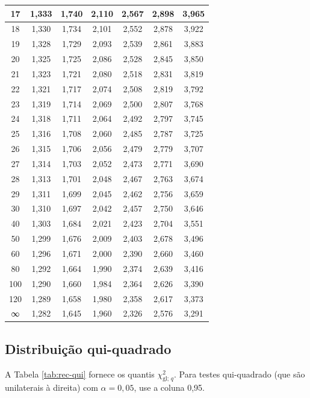 \documentclass[
]{book}
\begin{document}
\begin{table}
\begin{tabular}[t]{c|c|c|c|c|c|c}
\hline
17 & 1,333 & 1,740 & 2,110 & 2,567 & 2,898 & 3,965\\
\hline
18 & 1,330 & 1,734 & 2,101 & 2,552 & 2,878 & 3,922\\
\hline
19 & 1,328 & 1,729 & 2,093 & 2,539 & 2,861 & 3,883\\
\hline
20 & 1,325 & 1,725 & 2,086 & 2,528 & 2,845 & 3,850\\
\hline
21 & 1,323 & 1,721 & 2,080 & 2,518 & 2,831 & 3,819\\
\hline
22 & 1,321 & 1,717 & 2,074 & 2,508 & 2,819 & 3,792\\
\hline
23 & 1,319 & 1,714 & 2,069 & 2,500 & 2,807 & 3,768\\
\hline
24 & 1,318 & 1,711 & 2,064 & 2,492 & 2,797 & 3,745\\
\hline
25 & 1,316 & 1,708 & 2,060 & 2,485 & 2,787 & 3,725\\
\hline
26 & 1,315 & 1,706 & 2,056 & 2,479 & 2,779 & 3,707\\
\hline
27 & 1,314 & 1,703 & 2,052 & 2,473 & 2,771 & 3,690\\
\hline
28 & 1,313 & 1,701 & 2,048 & 2,467 & 2,763 & 3,674\\
\hline
29 & 1,311 & 1,699 & 2,045 & 2,462 & 2,756 & 3,659\\
\hline
30 & 1,310 & 1,697 & 2,042 & 2,457 & 2,750 & 3,646\\
\hline
40 & 1,303 & 1,684 & 2,021 & 2,423 & 2,704 & 3,551\\
\hline
50 & 1,299 & 1,676 & 2,009 & 2,403 & 2,678 & 3,496\\
\hline
60 & 1,296 & 1,671 & 2,000 & 2,390 & 2,660 & 3,460\\
\hline
80 & 1,292 & 1,664 & 1,990 & 2,374 & 2,639 & 3,416\\
\hline
100 & 1,290 & 1,660 & 1,984 & 2,364 & 2,626 & 3,390\\
\hline
120 & 1,289 & 1,658 & 1,980 & 2,358 & 2,617 & 3,373\\
\hline
∞ & 1,282 & 1,645 & 1,960 & 2,326 & 2,576 & 3,291\\
\hline
\end{tabular}
\end{table}

\subsection{Distribuição qui-quadrado}\label{distribuiuxe7uxe3o-qui-quadrado-1}

A Tabela \ref{tab:rec-qui} fornece os quantis \(\chi^2_{\text{gl};\,q}\). Para testes qui-quadrado (que são unilaterais à direita) com \(\alpha = 0{,}05\), use a coluna 0,95.
\end{document}
